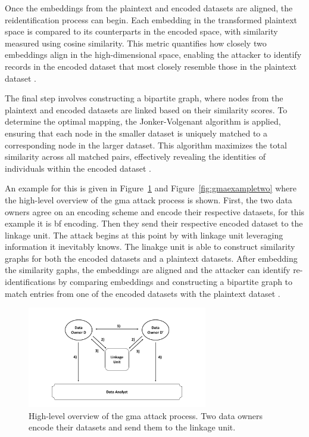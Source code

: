 Once the embeddings from the plaintext and encoded datasets are aligned, the reidentification process can begin.
Each embedding in the transformed plaintext space is compared to its counterparts in the encoded space, with similarity measured using cosine similarity.
This metric quantifies how closely two embeddings align in the high-dimensional space, enabling the attacker to identify records in the encoded dataset that most closely resemble those in the plaintext dataset \cite{schaefer2024}.

The final step involves constructing a bipartite graph, where nodes from the plaintext and encoded datasets are linked based on their similarity scores.
To determine the optimal mapping, the Jonker-Volgenant algorithm is applied, ensuring that each node in the smaller dataset is uniquely matched to a corresponding node in the larger dataset.
This algorithm maximizes the total similarity across all matched pairs, effectively revealing the identities of individuals within the encoded dataset \cite{schaefer2024}.

An example for this is given in Figure~\ref{fig:gmaexampleone} and Figure~\ref{fig:gmaexampletwo} where the high-level overview of the \ac{gma} attack process is shown.
First, the two data owners agree on an encoding scheme and encode their respective datasets, for this example it is \ac{bf} encoding.
Then they send their respective encoded dataset to the linkage unit.
The attack begins at this point by with linkage unit leveraging information it inevitably knows.
The linakge unit is able to construct similarity graphs for both the encoded datasets and a plaintext datasets.
After embedding the similarity gaphs, the embeddings are aligned and the attacker can identify re-identifications by comparing embeddings and constructing a bipartite graph to match entries from one of the encoded datasets with the plaintext dataset \cite{schaefer2024}.

\begin{figure}[H]
  \centering
  \includegraphics[width=0.7\textwidth, page=10]{img/visualization.pdf}
  \caption{High-level overview of the \ac{gma} attack process.
  Two data owners encode their datasets and send them to the linkage unit.}
  \label{fig:gmaexampleone}
\end{figure}

